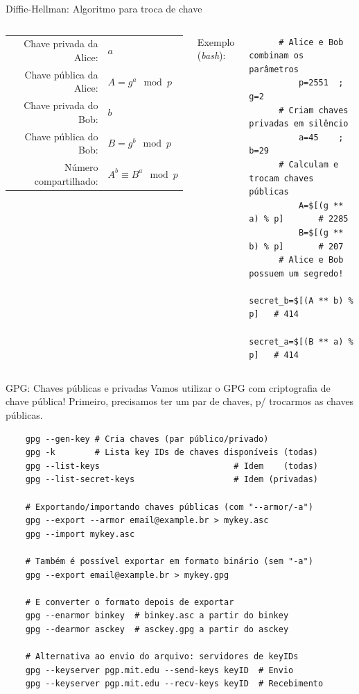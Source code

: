 \documentclass[utf8]{beamer}
\begin{document}
\begin{frame}[fragile]{Diffie-Hellman:
                       Algoritmo para troca de chave}
\begin{columns}[c]
{\begin{tabular}{rl}
        Chave privada da Alice: & $a$ \\
        Chave pública da Alice: & $A = g^a \mod p$ \\
        Chave privada do Bob: & $b$ \\
        Chave pública do Bob: & $B = g^b \mod p$ \\
        Número compartilhado: & $A^b \equiv B^a \mod p$
      \end{tabular}%
    }
    \vspace{.5em}\vfill
    Exemplo (\emph{bash}):
    \begin{verbatim}
      # Alice e Bob combinam os parâmetros
          p=2551  ;  g=2
      # Criam chaves privadas em silêncio
          a=45    ;  b=29
      # Calculam e trocam chaves públicas
          A=$[(g ** a) % p]       # 2285
          B=$[(g ** b) % p]       # 207
      # Alice e Bob possuem um segredo!
          secret_b=$[(A ** b) % p]   # 414
          secret_a=$[(B ** a) % p]   # 414
    \end{verbatim}
  \end{columns}
\end{frame}


\begin{frame}[fragile]{GPG: Chaves públicas e privadas}
  Vamos utilizar o GPG com criptografia de chave pública!
  Primeiro, precisamos ter um par de chaves,
  p/ trocarmos as chaves públicas.
  \vfill
  \begin{verbatim}
    gpg --gen-key # Cria chaves (par público/privado)
    gpg -k        # Lista key IDs de chaves disponíveis (todas)
    gpg --list-keys                           # Idem    (todas)
    gpg --list-secret-keys                    # Idem (privadas)

    # Exportando/importando chaves públicas (com "--armor/-a")
    gpg --export --armor email@example.br > mykey.asc
    gpg --import mykey.asc

    # Também é possível exportar em formato binário (sem "-a")
    gpg --export email@example.br > mykey.gpg

    # E converter o formato depois de exportar
    gpg --enarmor binkey  # binkey.asc a partir do binkey
    gpg --dearmor asckey  # asckey.gpg a partir do asckey

    # Alternativa ao envio do arquivo: servidores de keyIDs
    gpg --keyserver pgp.mit.edu --send-keys keyID  # Envio
    gpg --keyserver pgp.mit.edu --recv-keys keyID  # Recebimento
  \end{verbatim}
\end{frame}
\end{document}
